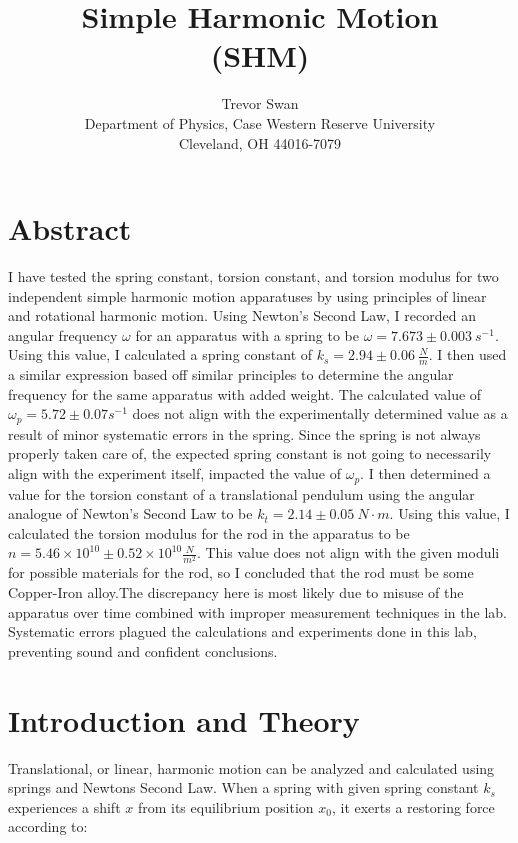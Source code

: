 \documentclass[12pt]{article}
\title{Simple Harmonic Motion \\ \small (SHM)}
\author{Trevor Swan \\
Department of Physics, Case Western Reserve University \\
Cleveland, OH 44016-7079}
\date{}
\begin{document}
\pagestyle{fancy}
\fancyhf{}

\maketitle
\thispagestyle{fancy}
\renewcommand{\headrulewidth}{0pt}

\fancyfoot[C]{\thepage}

\section{Abstract}
I have tested the spring constant, torsion constant, and torsion modulus for two independent simple harmonic motion apparatuses by using principles of linear and rotational harmonic motion. Using Newton's Second Law, I recorded an angular frequency $\omega$ for an apparatus with a spring to be $\omega=7.673\pm0.003\ s^{-1}$. Using this value, I calculated a spring constant of $k_s=2.94\pm0.06\ \frac{N}{m}$. I then used a similar expression based off similar principles to determine the angular frequency for the same apparatus with added weight. The calculated value of $\omega_p=5.72\pm0.07 s^{-1}$ does not align with the experimentally determined value as a result of minor systematic errors in the spring. Since the spring is not always properly taken care of, the expected spring constant is not going to necessarily align with the experiment itself, impacted the value of $\omega_p$. I then determined a value for the torsion constant of a translational pendulum using the angular analogue of Newton's Second Law to be $k_t=2.14\pm0.05\ N\cdot m$. Using this value, I calculated the torsion modulus for the rod in the apparatus to be $n=5.46\times10^{10}\pm0.52\times10^{10} \frac{N}{m^2}$. This value does not align with the given moduli for possible materials for the rod, so I concluded that the rod must be some Copper-Iron alloy.The discrepancy here is most likely due to misuse of the apparatus over time combined with improper measurement techniques in the lab. Systematic errors plagued the calculations and experiments done in this lab, preventing sound and confident conclusions.

\section{Introduction and Theory}
Translational, or linear, harmonic motion can be analyzed and calculated using springs and Newtons Second Law. When a spring with given spring constant $k_{s}$ experiences a shift $x$ from its equilibrium position $x_0$, it exerts a restoring force according to:
\end{document}
